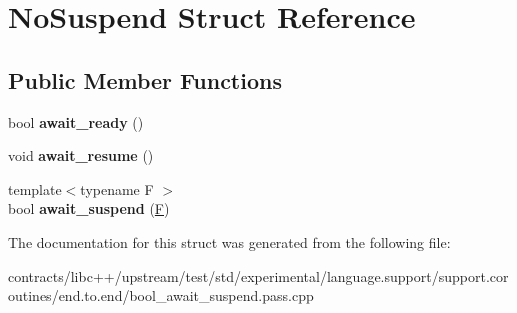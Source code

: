 \hypertarget{struct_no_suspend}{}\section{No\+Suspend Struct Reference}
\label{struct_no_suspend}
\subsection*{Public Member Functions}
\begin{DoxyCompactItemize}
\item 
\mbox{\label{struct_no_suspend_a554cdc1a189099f62995f19d0efc7c4e}} 
bool {\bfseries await\+\_\+ready} ()
\item 
\mbox{\label{struct_no_suspend_ad8c4cb89d2e6087fe0de0d2e0573e63b}} 
void {\bfseries await\+\_\+resume} ()
\item 
\mbox{\label{struct_no_suspend_a581da00dc35779a999b1bd7b0ffbf75b}} 
{\footnotesize template$<$typename F $>$ }\\bool {\bfseries await\+\_\+suspend} (\mbox{\hyperlink{struct_f}{F}})
\end{DoxyCompactItemize}


The documentation for this struct was generated from the following file\+:\begin{DoxyCompactItemize}
\item 
contracts/libc++/upstream/test/std/experimental/language.\+support/support.\+coroutines/end.\+to.\+end/bool\+\_\+await\+\_\+suspend.\+pass.\+cpp\end{DoxyCompactItemize}
